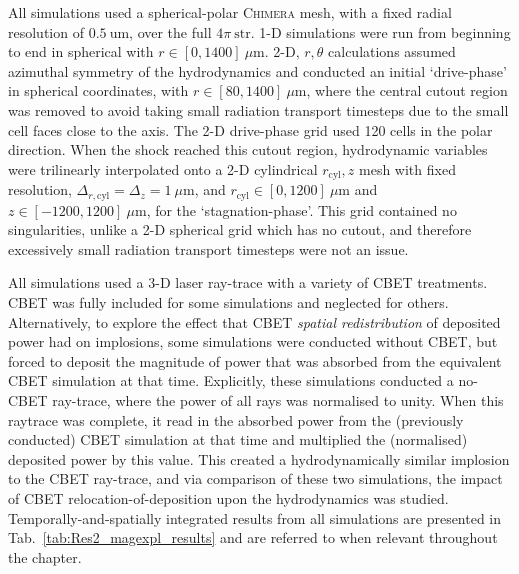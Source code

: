 All simulations used a spherical-polar \textsc{Chimera} mesh, with a fixed radial resolution of $0.5\ \text{um}$, over the full $4\pi\ \text{str}$.
1-D simulations were run from beginning to end in spherical with $r\in[0,1400]\ \mu\text{m}$.
2-D, $r,\theta$ calculations assumed azimuthal symmetry of the hydrodynamics and conducted an initial `drive-phase' in spherical coordinates, with $r\in[80,1400]\ \mu\text{m}$, where the central cutout region was removed to avoid taking small radiation transport timesteps due to the small cell faces close to the axis.
The 2-D drive-phase grid used 120 cells in the polar direction.
When the shock reached this cutout region, hydrodynamic variables were trilinearly interpolated onto a 2-D cylindrical $r_{\text{cyl}},z$ mesh with fixed resolution, $\Delta_{r,\text{cyl}}=\Delta_z=1\ \mu\text{m}$, and $r_{\text{cyl}}\in[0,1200]\ \mu\text{m}$ and $z\in[-1200,1200]\ \mu\text{m}$, for the `stagnation-phase'.
This grid contained no singularities, unlike a 2-D spherical grid which has no cutout, and therefore excessively small radiation transport timesteps were not an issue.

All simulations used a 3-D laser ray-trace with a variety of \ac{CBET} treatments.
\ac{CBET} was fully included for some simulations and neglected for others.
Alternatively, to explore the effect that \ac{CBET} \textit{spatial redistribution} of deposited power had on implosions, some simulations were conducted without \ac{CBET}, but forced to deposit the magnitude of power that was absorbed from the equivalent \ac{CBET} simulation at that time.
Explicitly, these simulations conducted a no-\ac{CBET} ray-trace, where the power of all rays was normalised to unity.
When this raytrace was complete, it read in the absorbed power from the (previously conducted) \ac{CBET} simulation at that time and multiplied the (normalised) deposited power by this value.
This created a hydrodynamically similar implosion to the \ac{CBET} ray-trace, and via comparison of these two simulations, the impact of \ac{CBET} relocation-of-deposition upon the hydrodynamics was studied.
Temporally-and-spatially integrated results from all simulations are presented in Tab.~\ref{tab:Res2_magexpl_results} and are referred to when relevant throughout the chapter.

